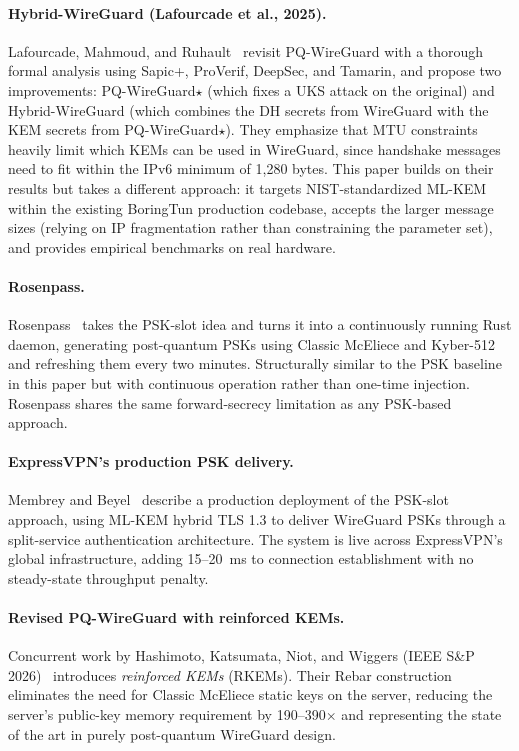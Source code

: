 \documentclass[11pt,a4paper]{article}
\begin{document}
\paragraph{Hybrid-WireGuard (Lafourcade et al., 2025).}
Lafourcade, Mahmoud, and Ruhault~\cite{lafourcade2025hybrid} revisit PQ-WireGuard with a thorough formal analysis using Sapic+, ProVerif, DeepSec, and Tamarin, and propose two improvements: PQ-WireGuard$\star$ (which fixes a UKS attack on the original) and Hybrid-WireGuard (which combines the DH secrets from WireGuard with the KEM secrets from PQ-WireGuard$\star$). They emphasize that MTU constraints heavily limit which KEMs can be used in WireGuard, since handshake messages need to fit within the IPv6 minimum of 1,280 bytes. This paper builds on their results but takes a different approach: it targets NIST-standardized ML-KEM within the existing BoringTun production codebase, accepts the larger message sizes (relying on IP fragmentation rather than constraining the parameter set), and provides empirical benchmarks on real hardware.

\paragraph{Rosenpass.}
Rosenpass~\cite{rosenpass,rosenpass-github} takes the PSK-slot idea and turns it into a continuously running Rust daemon, generating post-quantum PSKs using Classic McEliece and Kyber-512 and refreshing them every two minutes. Structurally similar to the PSK baseline in this paper but with continuous operation rather than one-time injection. Rosenpass shares the same forward-secrecy limitation as any PSK-based approach.

\paragraph{ExpressVPN's production PSK delivery.}
Membrey and Beyel~\cite{membrey2025expressvpn} describe a production deployment of the PSK-slot approach, using ML-KEM hybrid TLS 1.3 to deliver WireGuard PSKs through a split-service authentication architecture. The system is live across ExpressVPN's global infrastructure, adding 15--20~ms to connection establishment with no steady-state throughput penalty.

\paragraph{Revised PQ-WireGuard with reinforced KEMs.}
Concurrent work by Hashimoto, Katsumata, Niot, and Wiggers (IEEE S\&P 2026)~\cite{hashimoto2026rkem} introduces \emph{reinforced KEMs} (RKEMs). Their Rebar construction eliminates the need for Classic McEliece static keys on the server, reducing the server's public-key memory requirement by 190--390$\times$ and representing the state of the art in purely post-quantum WireGuard design.
\end{document}
